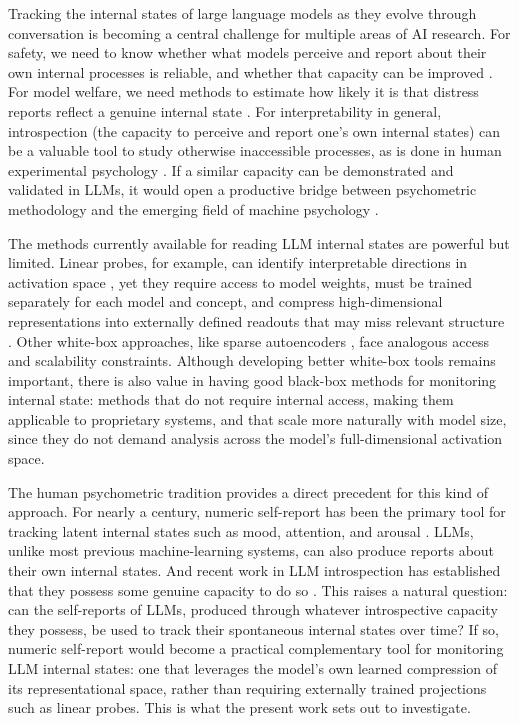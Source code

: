 \documentclass[10pt]{article}
\begin{document}
Tracking the internal states of large language models as they evolve through conversation is becoming a central challenge for multiple areas of AI research. For safety, we need to know whether what models perceive and report about their own internal processes is reliable, and whether that capacity can be improved \citep{JiAn2025, Steyvers2025}. For model welfare, we need methods to estimate how likely it is that distress reports reflect a genuine internal state \citep{PerezLong2023, Long2024, DungTagliabue2025}. For interpretability in general, introspection (the capacity to perceive and report one's own internal states) can be a valuable tool to study otherwise inaccessible processes, as is done in human experimental psychology \citep{FlemingLau2014, Fleming2024, KieferKammer2024}. If a similar capacity can be demonstrated and validated in LLMs, it would open a productive bridge between psychometric methodology and the emerging field of machine psychology \citep{Hagendorff2023}.

The methods currently available for reading LLM internal states are powerful but limited. Linear probes, for example, can identify interpretable directions in activation space \citep{AlainBengio2018, Kim2018, GurneeTegmark2023}, yet they require access to model weights, must be trained separately for each model and concept, and compress high-dimensional representations into externally defined readouts that may miss relevant structure \citep{Belinkov2022, HewittLiang2019, Pimentel2020}. Other white-box approaches, like sparse autoencoders \citep{Bricken2023}, face analogous access and scalability constraints. Although developing better white-box tools remains important, there is also value in having good black-box methods for monitoring internal state: methods that do not require internal access, making them applicable to proprietary systems, and that scale more naturally with model size, since they do not demand analysis across the model's full-dimensional activation space.

The human psychometric tradition provides a direct precedent for this kind of approach. For nearly a century, numeric self-report has been the primary tool for tracking latent internal states such as mood, attention, and arousal \citep{Likert1932, Watson1988, CsikszentmihalyiLarson1987, Shiffman2008}. LLMs, unlike most previous machine-learning systems, can also produce reports about their own internal states. And recent work in LLM introspection has established that they possess some genuine capacity to do so \citep{Binder2025, JiAn2025, Lindsey2026, PearsonVogel2026}. This raises a natural question: can the self-reports of LLMs, produced through whatever introspective capacity they possess, be used to track their spontaneous internal states over time? If so, numeric self-report would become a practical complementary tool for monitoring LLM internal states: one that leverages the model's own learned compression of its representational space, rather than requiring externally trained projections such as linear probes. This is what the present work sets out to investigate.
\end{document}
